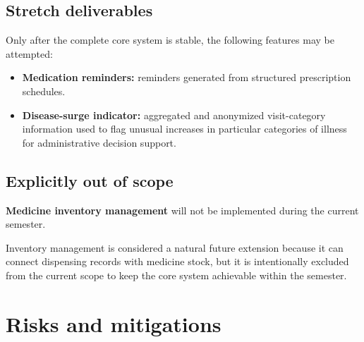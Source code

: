 \documentclass[11pt,a4paper]{article}
\begin{document}
\subsection{Stretch deliverables}

Only after the complete core system is stable, the following features may be attempted:

\begin{itemize}

    \item \textbf{Medication reminders:} reminders generated from structured prescription schedules.

    \item \textbf{Disease-surge indicator:} aggregated and anonymized visit-category information used to flag unusual increases in particular categories of illness for administrative decision support.

\end{itemize}

\subsection{Explicitly out of scope}

\textbf{Medicine inventory management} will not be implemented during the current semester.

Inventory management is considered a natural future extension because it can connect dispensing records with medicine stock, but it is intentionally excluded from the current scope to keep the core system achievable within the semester.


\section{Risks and mitigations}
\end{document}
